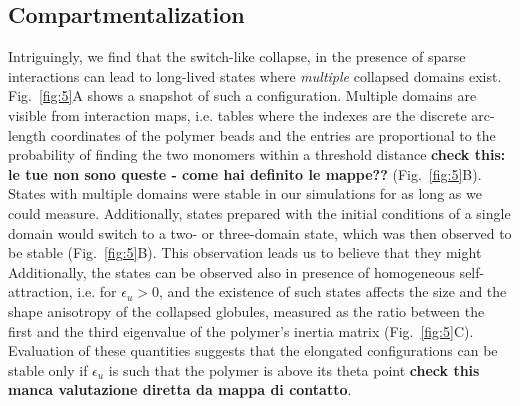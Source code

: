 \documentclass[
preprint,
a4paper,
12pt,
superscriptaddress,
pre]{revtex4}
\begin{document}


\subsection*{Compartmentalization}


Intriguingly, we find that the switch-like collapse, in the presence
of sparse interactions can lead to long-lived states where
\emph{multiple} collapsed domains exist. Fig.~\ref{fig:5}A shows a
snapshot of such a configuration. Multiple domains are visible from
interaction maps, i.e. tables where the indexes are the discrete
arc-length coordinates of the polymer beads and the entries are
proportional to the probability of finding the two monomers within a
threshold distance \textbf{check this: le tue non sono queste - come
  hai definito le mappe??} (Fig.~\ref{fig:5}B). States with multiple
domains were stable in our simulations for as long as we could
measure. Additionally, states prepared with the initial conditions of
a single domain would switch to a two- or three-domain state, which
was then observed to be stable (Fig.~\ref{fig:5}B). This observation
leads us to believe that they might 
%
Additionally, the states can be observed also in presence of
homogeneous self-attraction, i.e. for $\epsilon_u>0$, and the
existence of such states affects the size and the shape anisotropy of
the collapsed globules, measured as the ratio between the first and
the third eigenvalue of the polymer's inertia matrix
(Fig.~\ref{fig:5}C). Evaluation of these quantities suggests that the
elongated configurations can be stable only if $\epsilon_u$ is such
that the polymer is above its theta point \textbf{check this manca
  valutazione diretta da mappa di contatto}.
\end{document}
